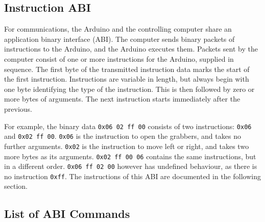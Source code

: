 \newcommand{\abispec}[6]{
\subsubsection{\texttt{#1}}

\begin{tabularx}{\textwidth}{>{\hsize=.5\hsize}XX}
\textbf{Instruction byte:}               & \texttt{#2} \\
\textbf{Argument bytes:}                 & #3 \\
\textbf{Argument type(s):}               & \texttt{#4} \\
\textbf{Action:}                         & #5 \\
\textbf{Relation to low-level commands:} & #6 \\
\end{tabularx}
}

\subsection{Instruction ABI}

For communications, the Arduino and the controlling computer share an application binary interface (ABI). The computer sends binary packets of instructions to the Arduino, and the Arduino executes them.
Packets sent by the computer consist of one or more instructions for the Arduino, supplied in sequence. The first byte of the transmitted instruction data marks the start of the first instruction. 
Instructions are variable in length, but always begin with one byte identifying the type of the instruction. This is then followed by zero or more bytes of arguments.
The next instruction starts immediately after the previous.

For example, the binary data \texttt{0x06 02 ff 00} consists of two instructions: \texttt{0x06} and \texttt{0x02 ff 00}.
\texttt{0x06} is the instruction to open the grabbers, and takes no further arguments. \texttt{0x02} is the instruction to move left or right, and takes two more bytes as its arguments.
\texttt{0x02 ff 00 06} contains the same instructions, but in a different order. 
\texttt{0x06 ff 02 00} however has undefined behaviour, as there is no instruction \texttt{0xff}. 
The instructions of this ABI are documented in the following section.


\subsection{List of ABI Commands}

